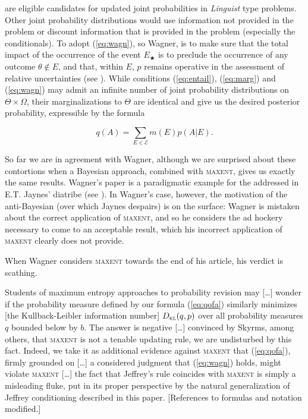 \documentclass[11pt]{article}
\begin{document}
are eligible candidates for updated joint probabilities in
\emph{Linguist} type problems. Other joint probability distributions
would use information not provided in the problem or discount
information that is provided in the problem (especially the
conditionals). To adopt (\ref{eq:wagn}), so Wagner, is to make sure
that the total impact of the occurrence of the event $E_{\bigstar}$ is
to preclude the occurrence of any outcome $\theta\notin{}E$, and that,
within $E$, $p$ remains operative in the assessment of relative
uncertainties (see ). While conditions
(\ref{eq:entail}), (\ref{eq:marg}) and (\ref{eq:wagn}) may admit an
infinite number of joint probability distributions on
$\Theta\times\Omega$, their marginalizations to $\Theta$ are identical
and give us the desired posterior probability, expressible by the
formula

\begin{equation}
  \label{eq:qofa}
  q(A)=\sum_{E\in\mathcal{E}}m(E)p(A|E).
\end{equation}

So far we are in agreement with Wagner, although we are surprised
about these contortions when a Bayesian approach, combined with
\textsc{maxent}, gives us exactly the same results. Wagner's paper is
a paradigmatic example for the 
addressed in E.T. Jaynes' diatribe (see ). In
Wagner's case, however, the motivation of the anti-Bayesian (over
which Jaynes despairs) is on the surface: Wagner is mistaken about the
correct application of \textsc{maxent}, and so he considers the ad
hockery necessary to come to an acceptable result, which his incorrect
application of \textsc{maxent} clearly does not provide.

When Wagner considers \textsc{maxent} towards the end
of his article, his verdict is scathing. 

\begin{quotex}
  Students of maximum entropy approaches to probability revision may
  [\ldots] wonder if the probability measure defined by our formula
  (\ref{eq:qofa}) similarly minimizes [the Kullback-Leibler
  information number] $D_{\textsc{kl}}(q,p)$ over all probability
  measures $q$ bounded below by $b$. The answer is negative [\ldots]
  convinced by Skyrms, among others, that \textsc{maxent} is not a
  tenable updating rule, we are undisturbed by this fact. Indeed, we
  take it as additional evidence against \textsc{maxent} that
  (\ref{eq:qofa}), firmly grounded on [\ldots] a considered judgment
  that (\ref{eq:wagn}) holds, might violate \textsc{maxent} [\ldots]
  the fact that Jeffrey's rule coincides with \textsc{maxent} is
  simply a misleading fluke, put in its proper perspective by the
  natural generalization of Jeffrey conditioning described in
  this paper. [References to formulas and notation modified.]
\end{quotex}
\end{document}
